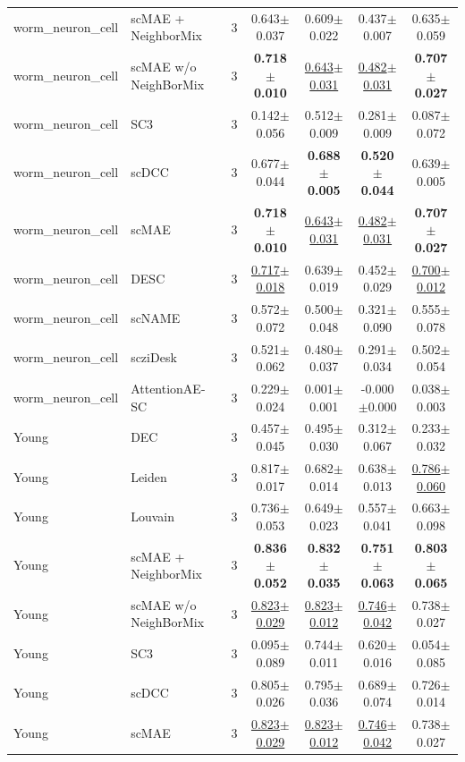 \begin{table}[t]
\begin{tabular}{llrcccc}
worm\_neuron\_cell & scMAE + NeighborMix & 3 & 0.643$\pm$0.037 & 0.609$\pm$0.022 & 0.437$\pm$0.007 & 0.635$\pm$0.059 \\
worm\_neuron\_cell & scMAE w/o NeighBorMix & 3 & \textbf{0.718$\pm$0.010} & \underline{0.643$\pm$0.031} & \underline{0.482$\pm$0.031} & \textbf{0.707$\pm$0.027} \\
worm\_neuron\_cell & SC3 & 3 & 0.142$\pm$0.056 & 0.512$\pm$0.009 & 0.281$\pm$0.009 & 0.087$\pm$0.072 \\
worm\_neuron\_cell & scDCC & 3 & 0.677$\pm$0.044 & \textbf{0.688$\pm$0.005} & \textbf{0.520$\pm$0.044} & 0.639$\pm$0.005 \\
worm\_neuron\_cell & scMAE & 3 & \textbf{0.718$\pm$0.010} & \underline{0.643$\pm$0.031} & \underline{0.482$\pm$0.031} & \textbf{0.707$\pm$0.027} \\
worm\_neuron\_cell & DESC & 3 & \underline{0.717$\pm$0.018} & 0.639$\pm$0.019 & 0.452$\pm$0.029 & \underline{0.700$\pm$0.012} \\
worm\_neuron\_cell & scNAME & 3 & 0.572$\pm$0.072 & 0.500$\pm$0.048 & 0.321$\pm$0.090 & 0.555$\pm$0.078 \\
worm\_neuron\_cell & scziDesk & 3 & 0.521$\pm$0.062 & 0.480$\pm$0.037 & 0.291$\pm$0.034 & 0.502$\pm$0.054 \\
worm\_neuron\_cell & AttentionAE-SC & 3 & 0.229$\pm$0.024 & 0.001$\pm$0.001 & -0.000$\pm$0.000 & 0.038$\pm$0.003 \\
\midrule
Young & DEC & 3 & 0.457$\pm$0.045 & 0.495$\pm$0.030 & 0.312$\pm$0.067 & 0.233$\pm$0.032 \\
Young & Leiden & 3 & 0.817$\pm$0.017 & 0.682$\pm$0.014 & 0.638$\pm$0.013 & \underline{0.786$\pm$0.060} \\
Young & Louvain & 3 & 0.736$\pm$0.053 & 0.649$\pm$0.023 & 0.557$\pm$0.041 & 0.663$\pm$0.098 \\
Young & scMAE + NeighborMix & 3 & \textbf{0.836$\pm$0.052} & \textbf{0.832$\pm$0.035} & \textbf{0.751$\pm$0.063} & \textbf{0.803$\pm$0.065} \\
Young & scMAE w/o NeighBorMix & 3 & \underline{0.823$\pm$0.029} & \underline{0.823$\pm$0.012} & \underline{0.746$\pm$0.042} & 0.738$\pm$0.027 \\
Young & SC3 & 3 & 0.095$\pm$0.089 & 0.744$\pm$0.011 & 0.620$\pm$0.016 & 0.054$\pm$0.085 \\
Young & scDCC & 3 & 0.805$\pm$0.026 & 0.795$\pm$0.036 & 0.689$\pm$0.074 & 0.726$\pm$0.014 \\
Young & scMAE & 3 & \underline{0.823$\pm$0.029} & \underline{0.823$\pm$0.012} & \underline{0.746$\pm$0.042} & 0.738$\pm$0.027 \\

\end{tabular}
\end{table}
